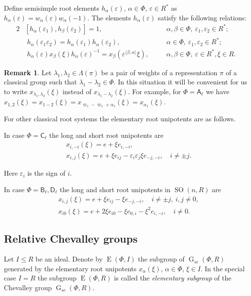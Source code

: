 \documentclass[12pt]{amsart}
\numberwithin{equation}{section}
\theoremstyle{definition}
\newtheorem{rem}[equation]{Remark}
\DeclareMathOperator{\G}{G}
\DeclareMathOperator{\SO}{SO}
\DeclareMathOperator{\E}{E}
\newcommand{\rA}{\mathsf{A}}
\newcommand{\rB}{\mathsf{B}}
\newcommand{\rC}{\mathsf{C}}
\newcommand{\rD}{\mathsf{D}}
\begin{document}
Define semisimple root elements $h_\alpha(\varepsilon)$, $\alpha\in\Phi$, $\varepsilon\in R^*$ as $h_\alpha(\varepsilon)=w_\alpha(\varepsilon)w_\alpha(-1)$.
The elements $h_\alpha(\varepsilon)$ satisfy the following relations:
\begin{alignat}{2}
& [ h_\alpha(\varepsilon_1), h_\beta(\varepsilon_2)] = 1, &\quad& \alpha, \beta \in \Phi,\ \varepsilon_1, \varepsilon_2 \in R^*; \label{rel:h-comm} \\
& \phantom{[} h_\alpha(\varepsilon_1 \varepsilon_2) = h_\alpha(\varepsilon_1) h_\alpha(\varepsilon_2), && \alpha \in \Phi,\ \varepsilon_1, \varepsilon_2 \in R^*; \label{rel:h-mult} \\
& \phantom{[} h_\alpha(\varepsilon)x_\beta(\xi)h_\alpha(\varepsilon)^{-1} = x_\beta\left(\varepsilon^{\langle\beta,\alpha\rangle}\xi\right), && \alpha, \beta \in \Phi,\ \varepsilon \in R^*, \xi \in R. \label{rel:h-w}
\end{alignat}

\begin{rem}
Let $\lambda_1, \lambda_2 \in \Lambda(\pi)$ be a pair of weights of a representation $\pi$ of a classical group such that $\lambda_1-\lambda_2\in \Phi$.
In this situation it will be convenient for us to write $x_{\lambda_1,\lambda_2}(\xi)$ instead of $x_{\lambda_1-\lambda_2}(\xi)$.
For example, for $\Phi=\rA_\ell$ we have $x_{1,2}(\xi)=x_{1-2}(\xi)=x_{\varpi_1 - \varpi_1 + \alpha_1}(\xi) = x_{\alpha_1}(\xi)$.
\end{rem}
For other classical root systems the elementary root unipotents are as follows.

In case $\Phi=\rC_\ell$ the long and short root unipotents are
\begin{align*}
& x_{i,-i}(\xi)=e+\xi e_{i,-i}, \\ 
& x_{i,j}(\xi)=e+\xi e_{ij}-\varepsilon_i\varepsilon_j\xi e_{-j,-i},\quad i\neq\pm j.
\end{align*}

Here $\varepsilon_i$ is the sign of $i$.

In case $\Phi=\rB_\ell,\rD_\ell$ the long and short root unipotents in $\SO(n,R)$ are
\begin{align*}
& x_{i,j}(\xi)=e+\xi e_{ij}-\xi e_{-j,-i},\quad i\neq\pm j,\ i,j\neq0, \\
& x_{i0}(\xi)=e+2\xi e_{i0}-\xi e_{0,i}-\xi^2 e_{i,-i},\quad i\neq0.
\end{align*}

\subsection{Relative Chevalley groups}\label{sec:relative-elementary}
Let $I\leq R$ be an ideal. Denote by $\E(\Phi, I)$ the subgroup of $\G_{sc}(\Phi, R)$ generated by the elementary root unipotents $x_\alpha(\xi)$, $\alpha\in\Phi$, $\xi\in I$.
In the special case $I=R$ the subgroup $\E(\Phi, R)$ is called the {\it elementary subgroup} of the Chevalley group $\G_{sc}(\Phi, R)$.
\end{document}
